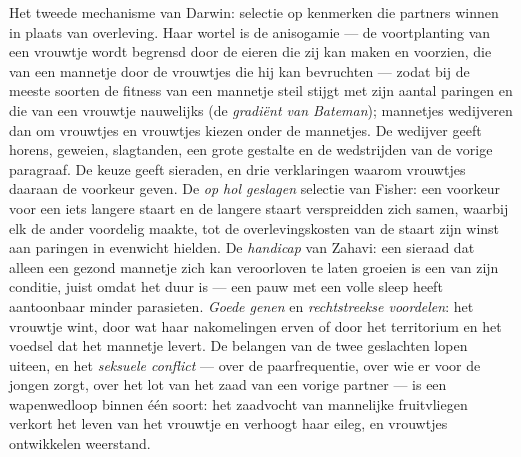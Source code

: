 \begin{definition}\label{def:b3:behavioural-ecology:sexual-selection}
Het tweede mechanisme van Darwin: selectie op kenmerken die partners
winnen in plaats van overleving. Haar wortel is de anisogamie --- de
voortplanting van een vrouwtje wordt begrensd door de eieren die zij
kan maken en voorzien, die van een mannetje door de vrouwtjes die hij
kan bevruchten --- zodat bij de meeste soorten de fitness van een
mannetje steil stijgt met zijn aantal paringen en die van een vrouwtje
nauwelijks (de \emph{gradiënt van Bateman}); mannetjes wedijveren dan
om vrouwtjes en vrouwtjes kiezen onder de mannetjes. De wedijver geeft
horens, geweien, slagtanden, een grote gestalte en de wedstrijden van
de vorige paragraaf. De keuze geeft sieraden, en drie verklaringen
waarom vrouwtjes daaraan de voorkeur geven. De \emph{op hol geslagen}
selectie van Fisher: een voorkeur voor een iets langere staart en de
langere staart verspreidden zich samen, waarbij elk de ander voordelig
maakte, tot de overlevingskosten van de staart zijn winst aan paringen
in evenwicht hielden. De \emph{handicap} van Zahavi: een sieraad dat
alleen een gezond mannetje zich kan veroorloven te laten groeien is een
 van zijn conditie, juist omdat het duur is --- een pauw
met een volle sleep heeft aantoonbaar minder parasieten. \emph{Goede
genen} en \emph{rechtstreekse voordelen}: het vrouwtje wint, door wat
haar nakomelingen erven of door het territorium en het voedsel dat het
mannetje levert. De belangen van de twee geslachten lopen uiteen, en
het \emph{seksuele conflict} --- over de paarfrequentie, over wie er
voor de jongen zorgt, over het lot van het zaad van een vorige partner
--- is een wapenwedloop binnen één soort: het zaadvocht van mannelijke
fruitvliegen verkort het leven van het vrouwtje en verhoogt haar
eileg, en vrouwtjes ontwikkelen weerstand.
\end{definition}

